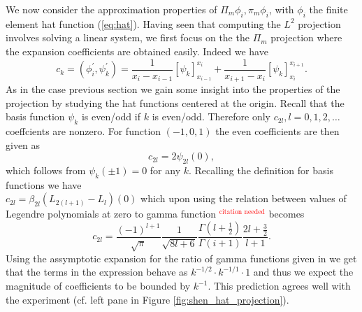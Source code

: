 \documentclass[a4paper,10pt]{article}
\newcommand{\inner}[2]{\ensuremath{\left(#1, #2\right)}}
\newcommand{\TODO}[1]{\textcolor{red}{#1}}
\begin{document}
  We now consider the approximation properties of $\Pi_m \phi_i, \pi_m \phi_i$,
  with $\phi_i$ the finite element hat function (\ref{eq:hat}). Having seen
  that computing the $L^2$ projection involves solving a linear system, we
  first focus on the the $\Pi_m$ projection where the expansion coefficients are
  obtained easily. Indeed we have
  \[
  c_k=\inner{\phi_i^{\prime}}{\psi_k^{\prime}} =
  \frac{1}{x_i - x_{i-1}}\left[\psi_k\right]_{x_{i-1}}^{x_i} +
  \frac{1}{x_{i+1} - x_{i}}\left[\psi_k\right]_{x_{i}}^{x_{i+1}}.
  \]
  As in the case previous section we gain some insight into the properties of the
  projection by studying the hat functions centered at the origin. Recall that
  the basis function $\psi_k$ is even/odd if $k$ is even/odd. Therefore only
  $c_{2l}, l=0, 1, 2, \dots$ coeffcients are nonzero. For function
  $(-1, 0, 1)$ the even coefficients are then given as
  \[
    c_{2l} = 2\psi_{2l}(0),
  \]
  which follows from $\psi_k(\pm 1)=0$ for any $k$. Recalling the definition
  for basis functions we have\\ $c_{2l}=\beta_{2l}\left(L_{2(l+1)}-
  L_{l}\right)\left(0\right)$ which upon using the relation between values of
  Legendre polynomials at zero to gamma function \TODO{$^\text{citation needed}$}
  becomes
  \[
    c_{2l} = \frac{\left(-1\right)^{l+1}}{\sqrt{\pi}}
             \frac{1}{\sqrt{8l + 6}}
             \frac{\Gamma\left(l+\tfrac{1}{2}\right)}{\Gamma\left(i+1\right)}
             \frac{2l+\tfrac{3}{2}}{l+1}.
  \]
  Using the assymptotic expansion for the ratio of gamma functions given
  in \cite{tricomi} we get that the terms in the expression behave as
  $k^{-1/2}\cdot k^{-1/1}\cdot1$ and thus we expect the magnitude of coefficients to
  be bounded by $k^{-1}$. This prediction agrees well with the experiment
  (cf. left pane in Figure \ref{fig:shen_hat_projection}).
  
\end{document}
